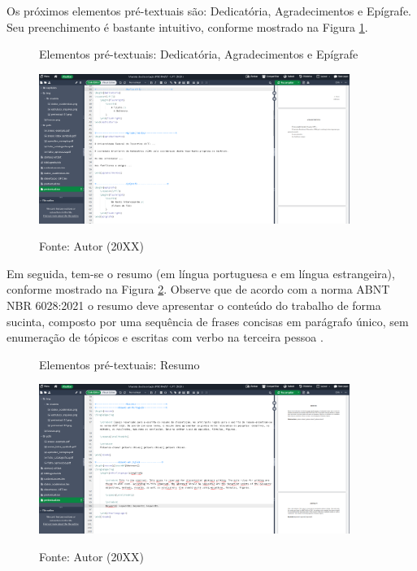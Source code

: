\begin{apendicesenv}
Os próximos elementos pré-textuais são: Dedicatória, Agradecimentos e Epígrafe. Seu preenchimento é bastante intuitivo, conforme mostrado na Figura \ref{fig:pretextual-02}.

\begin{figure}[H]
    \centering
    \caption{Elementos pré-textuais: Dedicatória, Agradecimentos e Epígrafe}
    \includegraphics[width=0.9\textwidth]{img/modelo/pretextual-02.png}
    \\
    \caption*{\small{Fonte: Autor (20XX)}}
    \label{fig:pretextual-02}
\end{figure}


Em seguida, tem-se o resumo (em língua portuguesa e em língua estrangeira), conforme mostrado na Figura \ref{fig:pretextual-03}. Observe que de acordo com a norma ABNT NBR 6028:2021 o resumo deve apresentar o conteúdo do trabalho de  forma sucinta, composto por uma sequência de frases concisas em parágrafo único, sem enumeração de tópicos e escritas com verbo na terceira pessoa \cite{nbr6028}.

\begin{figure}[H]
    \centering
    \caption{Elementos pré-textuais: Resumo}
    \includegraphics[width=0.9\textwidth]{img/modelo/pretextual-03.png}
    \\
    \caption*{\small{Fonte: Autor (20XX)}}
    \label{fig:pretextual-03}
\end{figure}


\end{apendicesenv}
